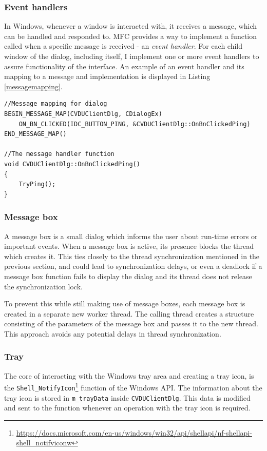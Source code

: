 \subsubsection{Event handlers}
In Windows, whenever a window is interacted with, it receives a message, which can be handled and responded to. MFC provides a way to implement a function called when a specific message is received - an \textit{event handler}. For each child window of the dialog, including itself, I implement one or more event handlers to assure functionality of the interface. An example of an event handler and its mapping to a message and implementation is displayed in Listing \ref{messagemapping}. 
\begin{lstlisting}[caption={Example of implemented and mapped click event handler}, label=messagemapping]
//Message mapping for dialog
BEGIN_MESSAGE_MAP(CVDUClientDlg, CDialogEx)
	ON_BN_CLICKED(IDC_BUTTON_PING, &CVDUClientDlg::OnBnClickedPing)
END_MESSAGE_MAP()

//The message handler function
void CVDUClientDlg::OnBnClickedPing()
{
	TryPing();
}
\end{lstlisting}

\subsubsection{Message box}
A message box is a small dialog which informs the user about run-time errors or important events. When a message box is active, its presence blocks the thread which creates it. This ties closely to the thread synchronization mentioned in the previous section, and could lead to synchronization delays, or even a deadlock if a message box function fails to display the dialog and its thread does not release the synchronization lock.

To prevent this while still making use of message boxes, each message box is created in a separate new worker thread. The calling thread creates a structure consisting of the parameters of the message box and passes it to the new thread. This approach avoids any potential delays in thread synchronization.

\subsubsection{Tray}
The core of interacting with the Windows tray area and creating a tray icon, is the \lstinline{Shell_NotifyIcon}\footnote{\url{https://docs.microsoft.com/en-us/windows/win32/api/shellapi/nf-shellapi-shell_notifyiconw}} function of the Windows API. The information about the tray icon is stored in \lstinline{m_trayData} inside \lstinline{CVDUClientDlg}. This data is modified and sent to the function whenever an operation with the tray icon is required.


